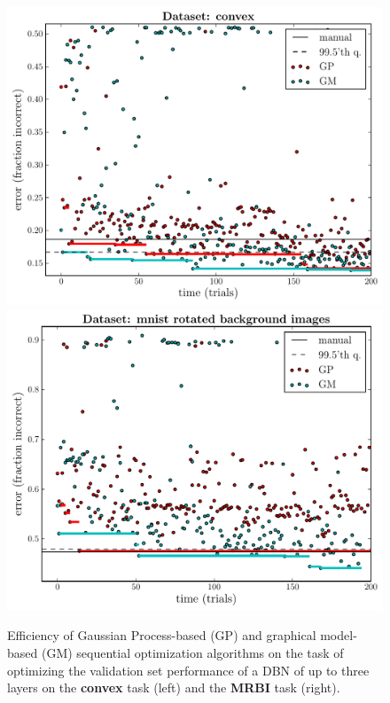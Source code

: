\documentclass{article}
\newcommand{\vs}[1]{\vspace*{-#1mm}}
\begin{document}
\begin{figure}
  \vs{0}
    \includegraphics[scale=.39]{../nips2011paper/figures/plot_histories_gp3,gm_convex}
    \includegraphics[scale=.39]{../nips2011paper/figures/plot_histories_gp3,gm_mnist_rotated_background_images}
  \vs{6}
    \caption{Efficiency of Gaussian Process-based (GP) and graphical
    model-based (GM) sequential optimization algorithms on the task of optimizing the validation set performance of a DBN of up to three layers on the {\bf convex} task (left) and the {\bf MRBI} task (right).
}
\end{figure}
\end{document}
